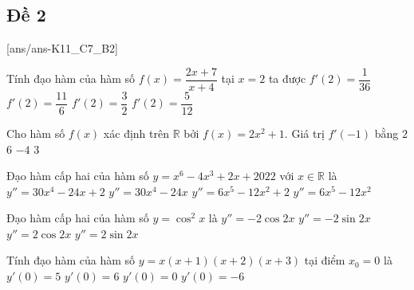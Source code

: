 
\subsection{Đề 2}

[ans/ans-K11_C7_B2]
\caulc

\begin{ex}%
	Tính đạo hàm của hàm số $ f(x)=\dfrac{2x+7}{x+4}$ tại $ x=2$ ta được
	\choice
	{\True $f'(2)=\dfrac{1}{36}$}
	{$f'(2)=\dfrac{11}{6}$}
	{$f'(2)=\dfrac{3}{2}$}
	{$f'(2)=\dfrac{5}{12}$}
\end{ex}

\begin{ex}%
	Cho hàm số $ f(x)$ xác định trên $\mathbb{R}$ bởi $ f(x)=2x^2+1$. Giá trị $f'\left(-1\right)$ bằng
	\choice
	{$2$}
	{$6$}
	{\True $-4$}
	{$3$}
\end{ex}

\begin{ex}%
	Đạo hàm cấp hai của hàm số $ y=x^6-4x^3+2x+2022$ với $ x\in\mathbb{R}$ là
	\choice
	{$y''=30x^4-24x+2$}
	{$y''=30x^4-24x$}
	{\True $y''=6x^5-12x^2+2$}
	{$y''=6x^5-12x^2$}
			\end{ex}
\begin{ex}%
		 Đạo hàm cấp hai của hàm số $ y=\cos^2x$ là
		\choice
		{\True $y''=-2\cos 2x$}
		{$y''=-2\sin 2x$}
		{$y''=2\cos 2x$}
		{$y''=2\sin 2x$}
	\end{ex}
	
	\begin{ex}%
		Tính đạo hàm của hàm số $y=x\left(x+1\right)\left(x+2\right)\left(x+3\right)$ tại điểm $x_0=0$ là
		\choice
		{$y'(0)=5$}
		{\True $y'(0)=6$}
		{$y'(0)=0$}
		{$y'(0)=-6$}
	\end{ex}
	

